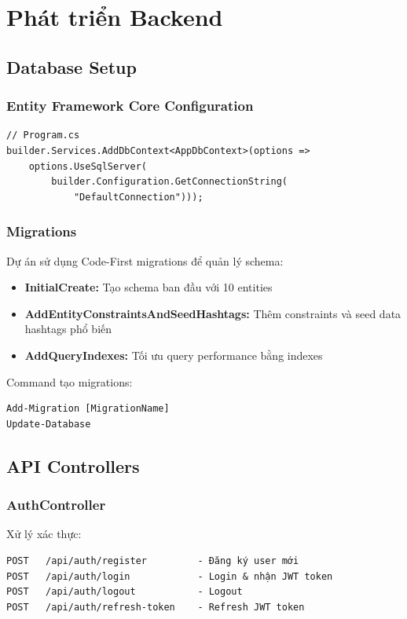 \section{Phát triển Backend}

\subsection{Database Setup}

\subsubsection{Entity Framework Core Configuration}
\begin{verbatim}
// Program.cs
builder.Services.AddDbContext<AppDbContext>(options =>
    options.UseSqlServer(
        builder.Configuration.GetConnectionString(
            "DefaultConnection")));
\end{verbatim}

\subsubsection{Migrations}
Dự án sử dụng Code-First migrations để quản lý schema:

\begin{itemize}
    \item \textbf{InitialCreate:} Tạo schema ban đầu với 10 entities
    \item \textbf{AddEntityConstraintsAndSeedHashtags:} Thêm constraints và seed data hashtags phổ biến
    \item \textbf{AddQueryIndexes:} Tối ưu query performance bằng indexes
\end{itemize}

Command tạo migrations:
\begin{verbatim}
Add-Migration [MigrationName]
Update-Database
\end{verbatim}

\subsection{API Controllers}

\subsubsection{AuthController}
Xử lý xác thực:

\begin{verbatim}
POST   /api/auth/register         - Đăng ký user mới
POST   /api/auth/login            - Login & nhận JWT token
POST   /api/auth/logout           - Logout
POST   /api/auth/refresh-token    - Refresh JWT token
\end{verbatim}


